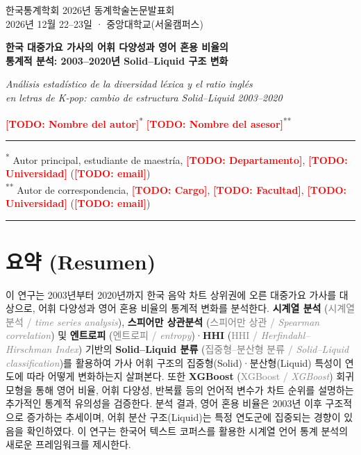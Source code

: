 \documentclass[11pt,a4paper]{article}
\newcommand{\term}[3]{\textbf{#1} (\textcolor{gray}{#2 / \textit{#3}})}
\newcommand{\todo}[1]{\textcolor{red}{\textbf{[TODO: #1]}}}
\begin{document}
{\footnotesize\raggedleft
한국통계학회 2026년 동계학술논문발표회\\
2026년 12월 22--23일 · 중앙대학교(서울캠퍼스)\par}

\vspace{1.2em}

\begin{center}
{\LARGE\bfseries
한국 대중가요 가사의 어휘 다양성과 영어 혼용 비율의\\[0.3em]
통계적 분석: 2003--2020년 Solid--Liquid 구조 변화\par}

\vspace{0.5em}
{\large\itshape
Análisis estadístico de la diversidad léxica y el ratio inglés\\[0.2em]
en letras de K-pop: cambio de estructura Solid--Liquid 2003--2020\par}

\vspace{1.2em}
{\large
\todo{Nombre del autor}\textsuperscript{*} \quad
\todo{Nombre del asesor}\textsuperscript{**}\par}
\end{center}

\vspace{0.5em}
\hrule
\vspace{0.5em}
{\footnotesize
\textsuperscript{*} Autor principal, estudiante de maestría, \todo{Departamento}, \todo{Universidad} (\todo{email})\\
\textsuperscript{**} Autor de correspondencia, \todo{Cargo}, \todo{Facultad}, \todo{Universidad} (\todo{email})\par}
\vspace{0.5em}
\hrule

\section*{요약 (Resumen)}

이 연구는 2003년부터 2020년까지 한국 음악 차트 상위권에 오른 대중가요 가사를
대상으로, 어휘 다양성과 영어 혼용 비율의 통계적 변화를 분석한다.
\term{시계열 분석}{시계열 분석}{time series analysis},
\term{스피어만 상관분석}{스피어만 상관}{Spearman correlation}
및 \term{엔트로피}{엔트로피}{entropy}·\term{HHI}{HHI}{Herfindahl--Hirschman Index}
기반의 \term{Solid--Liquid 분류}{집중형--분산형 분류}{Solid--Liquid classification}를
활용하여 가사 어휘 구조의 집중형(Solid)·분산형(Liquid) 특성이 연도에 따라
어떻게 변화하는지 살펴본다.
또한 \term{XGBoost}{XGBoost}{XGBoost} 회귀 모형을 통해
영어 비율, 어휘 다양성, 반복률 등의 언어적 변수가 차트 순위를 설명하는
추가적인 통계적 유의성을 검증한다.
분석 결과, 영어 혼용 비율은 2003년 이후 구조적으로 증가하는 추세이며,
어휘 분산 구조(Liquid)는 특정 연도군에 집중되는 경향이 있음을 확인하였다.
이 연구는 한국어 텍스트 코퍼스를 활용한 시계열 언어 통계 분석의
새로운 프레임워크를 제시한다.
\end{document}
